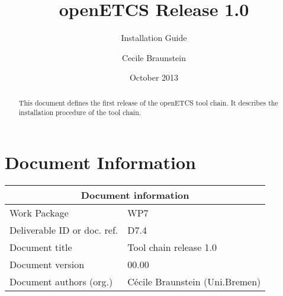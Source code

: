 \documentclass{openetcs_report}
\begin{document}
\frontmatter
{}




\title{openETCS  Release 1.0}

\subtitle{Installation Guide}

\date{October 2013}


\author{Cecile Braunstein}







\begin{abstract}
This document defines the first release of the openETCS tool chain. It
describes the installation procedure of the tool chain.
\end{abstract}

\maketitle
\tableofcontents

\newpage

\chapter{Document Information}
\begin{tabular}{|p{4.4cm}|p{8.7cm}|}
\hline
\multicolumn{2}{|c|}{Document information} \\
\hline
Work Package &  WP7  \\
Deliverable ID or doc. ref. & D7.4\\
\hline
Document title & Tool chain release 1.0 \\
Document version & 00.00 \\
Document authors (org.)  & Cécile Braunstein  (Uni.Bremen)  \\
\hline
\end{tabular}
\end{document}
